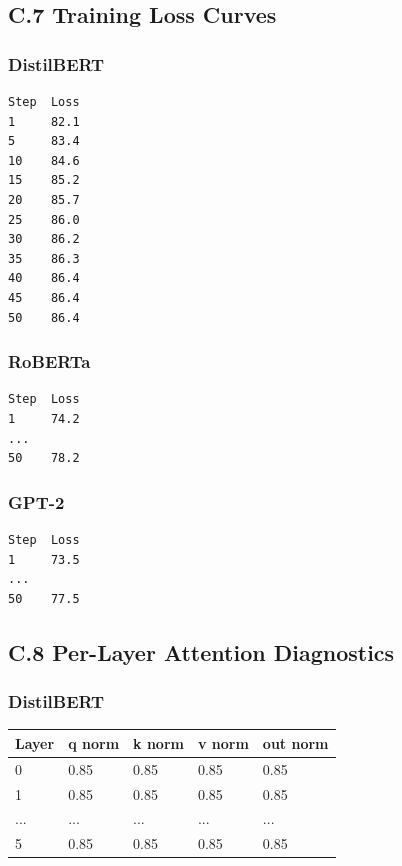 \subsection{C.7 Training Loss Curves}

\subsubsection{DistilBERT}

\begin{lstlisting}
Step  Loss
1     82.1
5     83.4
10    84.6
15    85.2
20    85.7
25    86.0
30    86.2
35    86.3
40    86.4
45    86.4
50    86.4
\end{lstlisting}

\subsubsection{RoBERTa}

\begin{lstlisting}
Step  Loss
1     74.2
...
50    78.2
\end{lstlisting}

\subsubsection{GPT-2}

\begin{lstlisting}
Step  Loss
1     73.5
...
50    77.5
\end{lstlisting}

\subsection{C.8 Per-Layer Attention Diagnostics}

\subsubsection{DistilBERT}

\begin{table}[H]
\centering
\small
\begin{tabular}{lllll}
\toprule
\textbf{Layer} & \textbf{q norm} & \textbf{k norm} & \textbf{v norm} & \textbf{out norm} \\
\midrule
0 & 0.85 & 0.85 & 0.85 & 0.85 \\
1 & 0.85 & 0.85 & 0.85 & 0.85 \\
... & ... & ... & ... & ... \\
5 & 0.85 & 0.85 & 0.85 & 0.85 \\
\bottomrule
\end{tabular}
\end{table}

